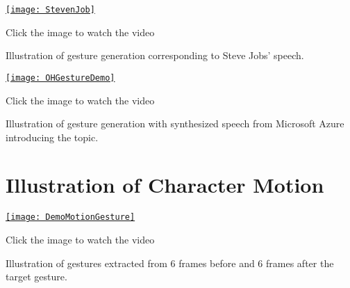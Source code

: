 {
	\begin{center}
		\centering
		\href{https://www.youtube.com/watch?v=B6nv1kQmi-Q}{%
		\texttt{[image: StevenJob]}}
		
		{\tiny Click the image to watch the video}
	\end{center}
}

Illustration of gesture generation corresponding to Steve Jobs’ speech.

{
	\begin{center}
		\centering
		\href{https://youtu.be/yLwXdm7UgPE}{%
			\texttt{[image: OHGestureDemo]}}
		
		{\tiny Click the image to watch the video}
	\end{center}
}

Illustration of gesture generation with synthesized speech from Microsoft Azure introducing the topic.

\section{Illustration of Character Motion}

\begin{center}
{
	\centering
	\href{https://www.youtube.com/watch?v=9IIIZP3EJLg}{%
	\texttt{[image: DemoMotionGesture]}}
	
	{\tiny Click the image to watch the video}
}
\end{center}
Illustration of gestures extracted from 6 frames before and 6 frames after the target gesture.
